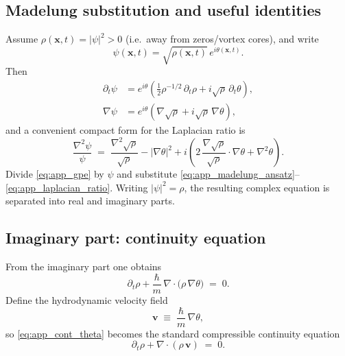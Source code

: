 \documentclass[11pt]{article}
\theoremstyle{plain}
\theoremstyle{definition}
\theoremstyle{remark}
\newcommand{\vfield}{\mathbf{v}}
\begin{document}
\subsection{Madelung substitution and useful identities}
Assume $\rho(\mathbf{x},t)=|\psi|^2>0$ (i.e.\ away from zeros/vortex cores), and write
\begin{equation}\label{eq:app_madelung_ansatz}
  \psi(\mathbf{x},t) = \sqrt{\rho(\mathbf{x},t)}\,e^{i\theta(\mathbf{x},t)}.
\end{equation}
Then
\begin{align}
  \partial_t\psi
  &= e^{i\theta}\left(\frac{1}{2}\rho^{-1/2}\,\partial_t\rho + i\sqrt{\rho}\,\partial_t\theta\right),\\
  \nabla\psi
  &= e^{i\theta}\left(\nabla\sqrt{\rho} + i\sqrt{\rho}\,\nabla\theta\right),
\end{align}
and a convenient compact form for the Laplacian ratio is
\begin{equation}\label{eq:app_laplacian_ratio}
  \frac{\nabla^2\psi}{\psi}
  \;=\;
  \frac{\nabla^2\sqrt{\rho}}{\sqrt{\rho}}
  - |\nabla\theta|^2
  + i\left(2\,\frac{\nabla\sqrt{\rho}}{\sqrt{\rho}}\cdot\nabla\theta + \nabla^2\theta\right).
\end{equation}
Divide \eqref{eq:app_gpe} by $\psi$ and substitute \eqref{eq:app_madelung_ansatz}--\eqref{eq:app_laplacian_ratio}.
Writing $|\psi|^2=\rho$, the resulting complex equation is separated into real and imaginary parts.

\subsection{Imaginary part: continuity equation}
From the imaginary part one obtains
\begin{equation}\label{eq:app_cont_theta}
  \partial_t\rho
  + \frac{\hbar}{m}\,\nabla\cdot\!\big(\rho\,\nabla\theta\big)
  \;=\; 0.
\end{equation}
Define the hydrodynamic velocity field
\begin{equation}\label{eq:app_velocity_def}
  \vfield \;\equiv\; \frac{\hbar}{m}\,\nabla\theta,
\end{equation}
so \eqref{eq:app_cont_theta} becomes the standard compressible continuity equation
\begin{equation}\label{eq:app_cont_v}
  \partial_t\rho + \nabla\cdot(\rho\,\vfield) \;=\; 0.
\end{equation}
\end{document}

